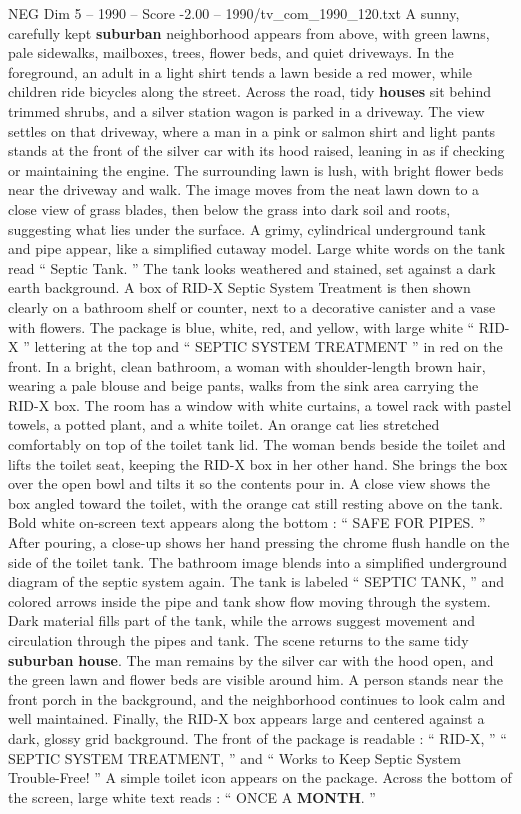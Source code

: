 \begin{textsample}{NEG Dim 5 – 1990 – Score -2.00 – 1990/tv\_com\_1990\_120.txt}  \label{ex:f5_neg_081}
A sunny, carefully kept \textbf{suburban} neighborhood appears from above, with green lawns, pale sidewalks, mailboxes, trees, flower beds, and quiet driveways.
In the foreground, an adult in a light shirt tends a lawn beside a red mower, while children ride bicycles along the street.
Across the road, tidy \textbf{houses} sit behind trimmed shrubs, and a silver station wagon is parked in a driveway.
The view settles on that driveway, where a man in a pink or salmon shirt and light pants stands at the front of the silver car with its hood raised, leaning in as if checking or maintaining the engine.
The surrounding lawn is lush, with bright flower beds near the driveway and walk.
The image moves from the neat lawn down to a close view of grass blades, then below the grass into dark soil and roots, suggesting what lies under the surface.
A grimy, cylindrical underground tank and pipe appear, like a simplified cutaway model.
Large white words on the tank read “ Septic Tank. ” The tank looks weathered and stained, set against a dark earth background.
A box of RID-X Septic System Treatment is then shown clearly on a bathroom shelf or counter, next to a decorative canister and a vase with flowers.
The package is blue, white, red, and yellow, with large white “ RID-X ” lettering at the top and “ SEPTIC SYSTEM TREATMENT ” in red on the front.
In a bright, clean bathroom, a woman with shoulder-length brown hair, wearing a pale blouse and beige pants, walks from the sink area carrying the RID-X box.
The room has a window with white curtains, a towel rack with pastel towels, a potted plant, and a white toilet.
An orange cat lies stretched comfortably on top of the toilet tank lid.
The woman bends beside the toilet and lifts the toilet seat, keeping the RID-X box in her other hand.
She brings the box over the open bowl and tilts it so the contents pour in.
A close view shows the box angled toward the toilet, with the orange cat still resting above on the tank.
Bold white on-screen text appears along the bottom : “ SAFE FOR PIPES. ” After pouring, a close-up shows her hand pressing the chrome flush handle on the side of the toilet tank.
The bathroom image blends into a simplified underground diagram of the septic system again.
The tank is labeled “ SEPTIC TANK, ” and colored arrows inside the pipe and tank show flow moving through the system.
Dark material fills part of the tank, while the arrows suggest movement and circulation through the pipes and tank.
The scene returns to the same tidy \textbf{suburban} \textbf{house}.
The man remains by the silver car with the hood open, and the green lawn and flower beds are visible around him.
A person stands near the front porch in the background, and the neighborhood continues to look calm and well maintained.
Finally, the RID-X box appears large and centered against a dark, glossy grid background.
The front of the package is readable : “ RID-X, ” “ SEPTIC SYSTEM TREATMENT, ” and “ Works to Keep Septic System Trouble-Free! ” A simple toilet icon appears on the package.
Across the bottom of the screen, large white text reads : “ ONCE A \textbf{MONTH}. ”

\end{textsample}
